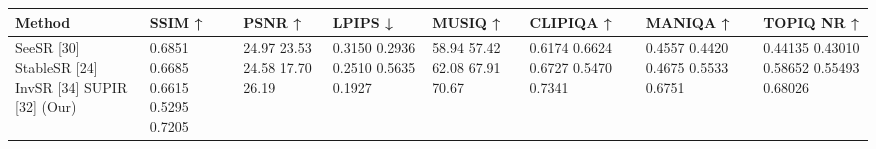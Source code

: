 \begin{tabular}{llllllll}
\toprule
Method & SSIM ↑ & PSNR ↑ & LPIPS ↓ & MUSIQ ↑ & CLIPIQA ↑ & MANIQA ↑ & TOPIQ NR ↑ \\
\midrule
SeeSR [30] StableSR [24] InvSR [34] SUPIR [32] (Our) & 0.6851 0.6685 0.6615 0.5295 0.7205 & 24.97 23.53 24.58 17.70 26.19 & 0.3150 0.2936 0.2510 0.5635 0.1927 & 58.94 57.42 62.08 67.91 70.67 & 0.6174 0.6624 0.6727 0.5470 0.7341 & 0.4557 0.4420 0.4675 0.5533 0.6751 & 0.44135 0.43010 0.58652 0.55493 0.68026 \\
\bottomrule
\end{tabular}
